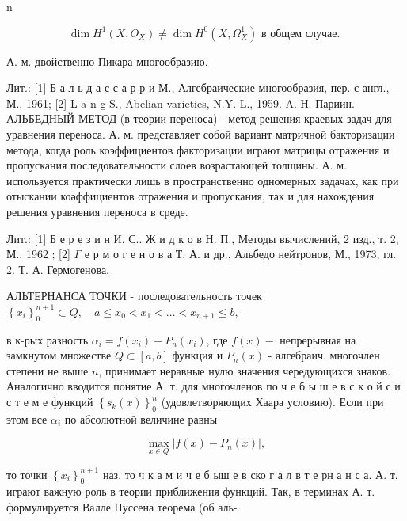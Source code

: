 \documentclass[10pt]{article}
\begin{document}
n



\[

\operatorname{dim} H^{1}\left(X, O_{X}\right) \neq \operatorname{dim} H^{0}\left(X, \Omega_{X}^{1}\right) \text { в общем случае. }

\]



А. м. двойственно Пикара многообразию.



Лит.: [1] Б а л ь д а с с а р р и М., Алгебраические многообразия, пер. с англ., М., 1961; [2] L a n g S., Abelian varieties, N.Y.-L., 1959. A. Н. Париин. АЛЬБЕДНЫЙ МЕТОД (в теории переноса) - метод решения краевых задач для уравнения переноса. А. м. представляет собой вариант матричной бакторизации метода, когда роль коэффициентов факторизации играют матрицы отражения и пропускания последовательности слоев возрастающей толщины. А. м. используется практически лишь в пространственно одномерных задачах, как при отыскании коәффициентов отражения и пропускания, так и для нахождения решения уравнения переноса в среде.



Лит.: [1] Б е р е з и н И. С.. Ж и д к о в Н. П., Методы вычислений, 2 изд., т. 2, М., 1962 ; [2] $\Gamma$ е р м о г е н о в а Т. А. и др., Альбедо нейтронов, М., 1973, гл. 2. Т. А. Гермогенова.



АЛЬТЕРНАНСА ТОЧКИ - последовательность точек $\left\{x_{i}\right\}_{0}^{n+1} \subset Q, \quad a \leqslant x_{0}<x_{1}<\ldots<x_{n+1} \leqslant b$,



в к-рых разность $\alpha_{i}=f\left(x_{i}\right)-P_{n}\left(x_{i}\right)$, где $f(x)-$ непрерывная на замкнутом множестве $Q \subset[a, b]$ функция и $P_{n}(x)$ - алгебраич. многочлен степени не выше $n$, принимает неравные нулю значения чередующихся знаков. Аналогично вводится понятие А. т. для многочленов по ч е б ы ш е в с к о й с и с т е м е функций $\left\{s_{k}(x)\right\}_{0}^{n}$ (удовлетворяющих Хаара условию). Если при этом все $\alpha_{i}$ по абсолютной величине равны



\[

\max _{x \in Q}\left|f(x)-P_{n}(x)\right|,

\]



то точки $\left\{x_{i}\right\}_{0}^{n+1}$ наз. то ч к а м и ч е б ыш е в ско г а л в т е рн а н с а. А. т. играют важную роль в теории приближения функций. Так, в терминах А. т. формулируется Валле Пуссена теорема (об аль-
\end{document}
